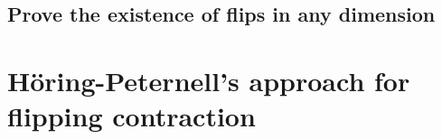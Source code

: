 \documentclass[11pt]{article}
\theoremstyle{definition}
\begin{document}
	
	\subsection{Prove the existence of flips in any dimension}
	
	
	\section{H\"oring-Peternell's approach for flipping contraction}
	
	
	
	
	
	
\end{document}
